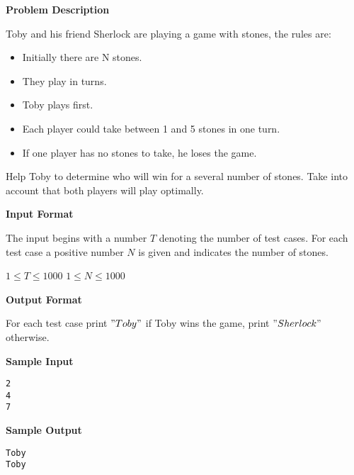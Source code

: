 \textbf{\large Problem Description}

Toby and his friend Sherlock are playing a game with stones, the rules are:
\begin{itemize}
\item Initially there are N stones.
\item  They play in turns.
\item  Toby plays first.
\item  Each player could take between 1 and 5 stones in one turn.
\item  If one player has no stones to take, he loses the game.
\end{itemize}

Help Toby to determine who will win for a several number of stones. Take into account that both players will play optimally.

\textbf{\large Input Format}

The input begins with a number $T$ denoting the number of test cases. For each
test case a positive number $N$ is given and indicates the number of stones.

$ 1 \le T \le 1000 $
$ 1 \le N \le 1000 $

\textbf{\large Output Format}

For each test case print $"Toby"$ if Toby wins the game, print $"Sherlock"$ otherwise.

\textbf{\large Sample Input}

\begin{verbatim}
2
4
7
\end{verbatim}

\textbf{\large Sample Output}

\begin{verbatim}
Toby
Toby
\end{verbatim}

\newpage
